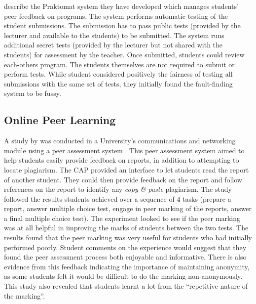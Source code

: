 \documentclass[sigplan,10pt,review]{acmart}\settopmatter{printfolios=true}
\begin{document}
\citet{Zeller_ITiCSE-2000} describe the Praktomat system they have
developed which manages students' peer feedback on programs. The
system performs automatic testing of the student submissions. The
submission has to pass public
tests (provided by the lecturer and available to the students)  to be
submitted. The system runs additional secret tests (provided by the
lecturer but not shared with the students) for assessment by
the teacher.  Once submitted, students could review each-others
program. The students themselves are not required to submit or perform
tests. While student considered positively the fairness of testing all
submissions with the same set of tests, they initially found the
fault-finding system to be fussy.


\subsection{Online Peer Learning}


A study by \citet{davies_computerized_2000} was conducted in a
University's communications and networking module using a peer
assessment system . This peer assessment system aimed to help students
easily provide feedback on reports, in addition to attempting to
locate plagiarism. The \ac{CAP} provided an interface to let students
read the report of another student. They could then provide feedback
on the report and follow references on the report to identify any
\textit{copy \& paste} plagiarism. The study followed the results
students achieved over a sequence of 4 tasks (prepare a report, answer
multiple choice test, engage in peer marking of the reports, answer a
final multiple choice test).  The experiment looked to see if the peer
marking was at all helpful in improving the marks of students between
the two tests. The results found that the peer marking was very useful
for students who had initially performed poorly. Student comments on
the experience would suggest that they found the peer assessment
process both enjoyable and informative. There is also evidence from
this feedback indicating the importance of maintaining anonymity, as
some students felt it would be difficult to do the marking
non-anonymously.  This study also revealed that students learnt a lot
from the ``repetitive nature of the marking''.
\end{document}
